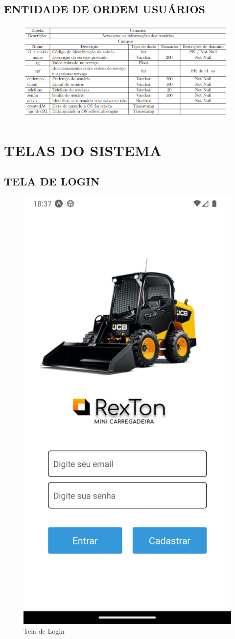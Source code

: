 \newpage
\subsection{ENTIDADE DE ORDEM USUÁRIOS}
\begin{figure}[htb]
	\begin{center}
	    \includegraphics[width=1\linewidth]{imagens/dc5.png}
	\end{center}
\end{figure}


\newpage
\section{TELAS DO SISTEMA}
\subsection{TELA DE LOGIN}
\begin{figure}[htb]
	\caption{\label{fig_diagrama-classes} Tela de Login}
	\begin{center}
	    \includegraphics[width=0.5\linewidth]{imagens/login.png}
	\end{center}
\end{figure}


